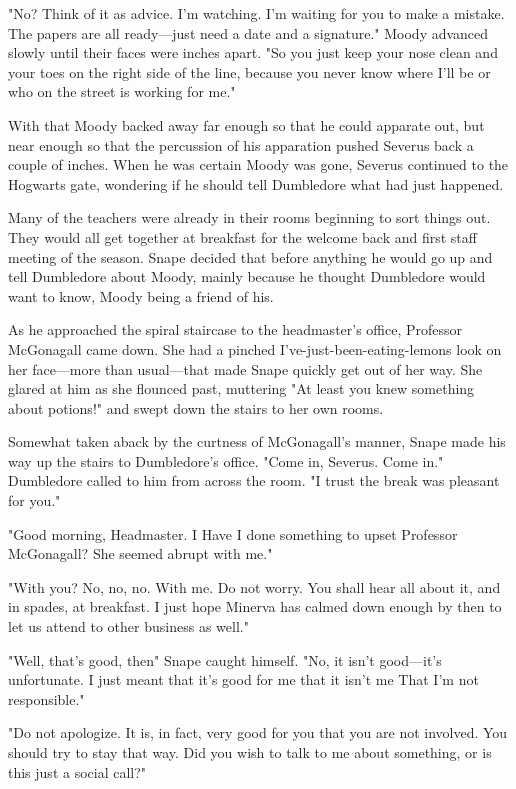 "No? Think of it as advice. I'm watching. I'm waiting for you to make a mistake. The papers are all ready—just need a date and a signature." Moody advanced slowly until their faces were inches apart. "So you just keep your nose clean and your toes on the right side of the line, because you never know where I'll be or who on the street is working for me."

With that Moody backed away far enough so that he could apparate out, but near enough so that the percussion of his apparation pushed Severus back a couple of inches. When he was certain Moody was gone, Severus continued to the Hogwarts gate, wondering if he should tell Dumbledore what had just happened.

Many of the teachers were already in their rooms beginning to sort things out. They would all get together at breakfast for the welcome back and first staff meeting of the season. Snape decided that before anything he would go up and tell Dumbledore about Moody, mainly because he thought Dumbledore would want to know, Moody being a friend of his.

As he approached the spiral staircase to the headmaster's office, Professor McGonagall came down. She had a pinched I've-just-been-eating-lemons look on her face—more than usual—that made Snape quickly get out of her way. She glared at him as she flounced past, muttering "At least you knew something about potions!" and swept down the stairs to her own rooms.

Somewhat taken aback by the curtness of McGonagall's manner, Snape made his way up the stairs to Dumbledore's office. "Come in, Severus. Come in." Dumbledore called to him from across the room. "I trust the break was pleasant for you."

"Good morning, Headmaster. I{\el} Have I done something to upset Professor McGonagall? She seemed abrupt with me."

"With you? No, no, no. With me. Do not worry. You shall hear all about it, and in spades, at breakfast. I just hope Minerva has calmed down enough by then to let us attend to other business as well."

"Well, that's good, then{\el}" Snape caught himself. "No, it isn't good—it's unfortunate. I just meant that it's good for me that it isn't me{\el} That I'm not responsible."

"Do not apologize. It is, in fact, very good for you that you are not involved. You should try to stay that way. Did you wish to talk to me about something, or is this just a social call?"

